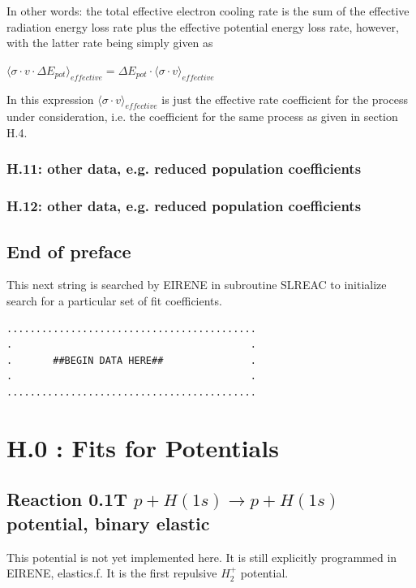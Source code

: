 \documentclass[12pt,dvips]{article}
\begin{document}
In other words: the total effective electron cooling rate
is the sum of the effective
radiation energy loss rate
plus the effective potential energy loss rate, however, with the latter rate being simply
given as

$\langle\sigma \cdot v \cdot \Delta E_{pot} \rangle_{effective} = \Delta E_{pot}
\cdot \langle\sigma \cdot v \rangle_{effective}$

In this expression $\langle\sigma \cdot v \rangle_{effective}$
is just the effective rate coefficient
for the process under consideration, i.e. the coefficient for the same process as given
in section H.4.
\newpage
\subsubsection*{H.11: other data, e.g. reduced population coefficients}
\subsubsection*{H.12: other data, e.g. reduced population coefficients}
\subsection*{End of preface}
This next string is searched by EIRENE in subroutine SLREAC
to initialize search for a particular set of fit coefficients.

\bigskip
\begin{small}\begin{verbatim}
...........................................
.                                         .
.       ##BEGIN DATA HERE##               .
.                                         .
...........................................
\end{verbatim}\end{small}
\newpage

\setcounter{section}{-1}
\section{H.0 :  Fits for Potentials}\label{secpot}

\subsection{
Reaction 0.1T $ p + H (1s) \rightarrow p + H (1s) $ potential, binary elastic }
This potential is not yet implemented here. It is still explicitly
programmed in EIRENE, elastics.f. It is the first repulsive $H_2^+$
potential.
\end{document}
